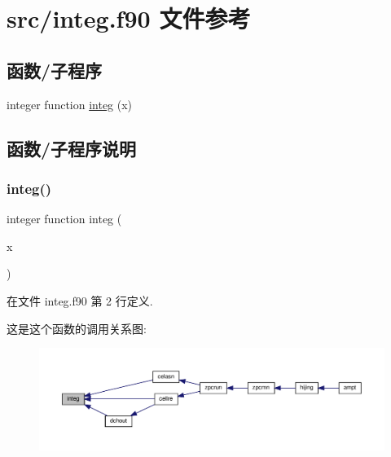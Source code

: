 \hypertarget{integ_8f90}{}\section{src/integ.f90 文件参考}
\label{integ_8f90}
\subsection*{函数/子程序}
\begin{DoxyCompactItemize}
\item 
integer function \mbox{\hyperlink{integ_8f90_a56341968ba50ba7a80a3a158f4c2b5e7}{integ}} (x)
\end{DoxyCompactItemize}


\subsection{函数/子程序说明}
\mbox{\label{integ_8f90_a56341968ba50ba7a80a3a158f4c2b5e7}} 
\subsubsection{\texorpdfstring{integ()}{integ()}}
{\footnotesize\ttfamily integer function integ (\begin{DoxyParamCaption}\item[{}]{x }\end{DoxyParamCaption})}



在文件 integ.\+f90 第 2 行定义.

这是这个函数的调用关系图\+:
\nopagebreak
\begin{figure}[H]
\begin{center}
\leavevmode
\includegraphics[width=350pt]{integ_8f90_a56341968ba50ba7a80a3a158f4c2b5e7_icgraph}
\end{center}
\end{figure}

